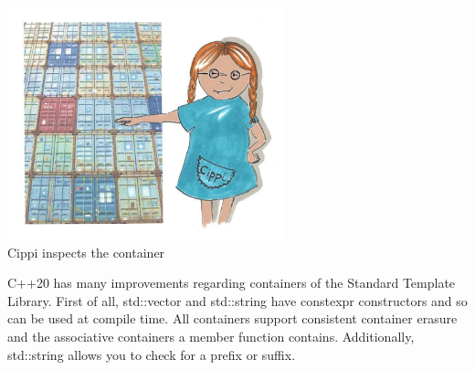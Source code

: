 \begin{center}
\includegraphics[width=0.6\textwidth]{content/3/chapter5/images/10.png}\\
Cippi inspects the container
\end{center}

C++20 has many improvements regarding containers of the Standard Template Library. First of all, std::vector and std::string have constexpr constructors and so can be used at compile time. All containers support consistent container erasure and the associative containers a member function contains. Additionally, std::string allows you to check for a prefix or suffix.


































